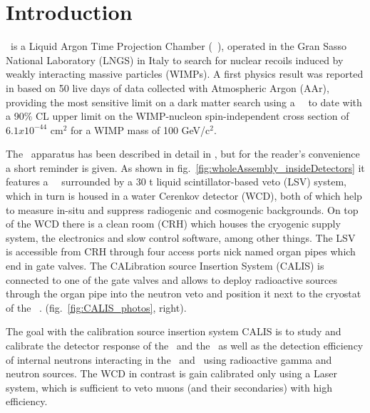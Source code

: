 \section{Introduction}\label{sec:intro}\label{sec:introduction}

\dsf\ is a Liquid Argon Time Projection Chamber (\lar\ \tpc), operated in the Gran Sasso National Laboratory (LNGS) in Italy to search for nuclear recoils induced by weakly interacting massive particles (WIMPs). A first physics result was reported in \cite{ds:ds-50:firstpaper} based on 50 live days of data collected with Atmospheric Argon (AAr), providing the most sensitive limit on a dark matter search using a \lar\ \tpc\ to date with a 90\% CL upper limit on the WIMP-nucleon spin-independent cross section of $6.1 x 10^{-44}$ cm$^2$ for a WIMP mass of 100 GeV/c$^2$.  %

The \dsf\ apparatus has been described in detail in \cite{ds:ds-50:firstpaper}, but for the reader's convenience a short reminder is given. As shown in fig.~\ref{fig:wholeAssembly_insideDetectors} it features a \lar\ \tpc\ surrounded by a 30 t liquid scintillator-based veto (LSV) system, which in turn is housed in a water Cerenkov detector (WCD), both of which help to measure in-situ and suppress radiogenic and cosmogenic backgrounds. On top of the WCD there is a clean room (CRH) which houses the cryogenic supply system, the electronics and slow control software, among other things. The LSV is accessible from CRH through four access ports nick named organ pipes which end in gate valves. The CALibration source Insertion System (CALIS) is connected to one of the gate valves and allows to deploy radioactive sources through the organ pipe into the neutron veto and position it next to the cryostat of the \lar\ \tpc. (fig.~\ref{fig:CALIS_photos}, right).

The goal with the calibration source insertion system CALIS is to study and calibrate the detector response of the \tpc\ and the \lsv\ as well as the detection efficiency of internal neutrons interacting in the \tpc\ and \lsv\ using radioactive gamma and neutron sources. The WCD in contrast is gain calibrated only using a Laser system, which is sufficient to veto muons (and their secondaries) with high efficiency.


